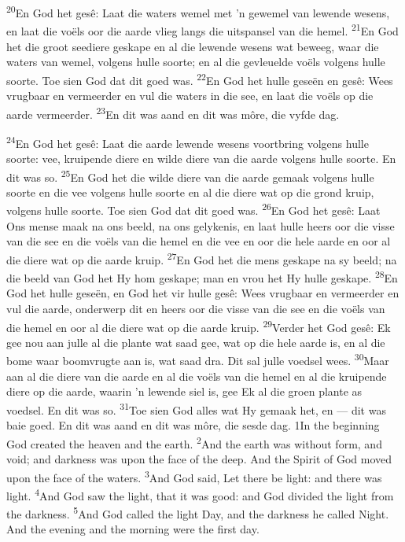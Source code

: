 \documentclass[10pt,oneside,a4paper]{memoir}
\renewcommand{\verse}[1]{\textsuperscript{#1}}
\begin{document}
\begin{paracol}{2}
\verse{20}En God het gesê: Laat die waters wemel met ’n gewemel van lewende wesens, en laat die voëls oor die aarde vlieg langs die uitspansel van die hemel.
\verse{21}En God het die groot seediere geskape en al die lewende wesens wat beweeg, waar die waters van wemel, volgens hulle soorte; en al die gevleuelde voëls volgens hulle soorte. Toe sien God dat dit goed was.
\verse{22}En God het hulle geseën en gesê: Wees vrugbaar en vermeerder en vul die waters in die see, en laat die voëls op die aarde vermeerder.
\verse{23}En dit was aand en dit was môre, die vyfde dag.

\verse{24}En God het gesê: Laat die aarde lewende wesens voortbring volgens hulle soorte: vee, kruipende diere en wilde diere van die aarde volgens hulle soorte. En dit was so.
\verse{25}En God het die wilde diere van die aarde gemaak volgens hulle soorte en die vee volgens hulle soorte en al die diere wat op die grond kruip, volgens hulle soorte. Toe sien God dat dit goed was.
\verse{26}En God het gesê: Laat Ons mense maak na ons beeld, na ons gelykenis, en laat hulle heers oor die visse van die see en die voëls van die hemel en die vee en oor die hele aarde en oor al die diere wat op die aarde kruip.
\verse{27}En God het die mens geskape na sy beeld; na die beeld van God het Hy hom geskape; man en vrou het Hy hulle geskape.
\verse{28}En God het hulle geseën, en God het vir hulle gesê: Wees vrugbaar en vermeerder en vul die aarde, onderwerp dit en heers oor die visse van die see en die voëls van die hemel en oor al die diere wat op die aarde kruip.
\verse{29}Verder het God gesê: Ek gee nou aan julle al die plante wat saad gee, wat op die hele aarde is, en al die bome waar boomvrugte aan is, wat saad dra. Dit sal julle voedsel wees.
\verse{30}Maar aan al die diere van die aarde en al die voëls van die hemel en al die kruipende diere op die aarde, waarin ’n lewende siel is, gee Ek al die groen plante as voedsel. En dit was so.
\verse{31}Toe sien God alles wat Hy gemaak het, en — dit was baie goed. En dit was aand en dit was môre, die sesde dag.
\switchcolumn
\lettrine{1}In the beginning God created the heaven and the earth.  
\verse{2}And the earth was without form, and void; and darkness was upon the face of the deep. And the Spirit of God moved upon the face of the waters.  
\verse{3}And God said, Let there be light: and there was light.  
\verse{4}And God saw the light, that it was good: and God divided the light from the darkness.  
\verse{5}And God called the light Day, and the darkness he called Night. And the evening and the morning were the first day.  


\end{paracol}
\end{document}
